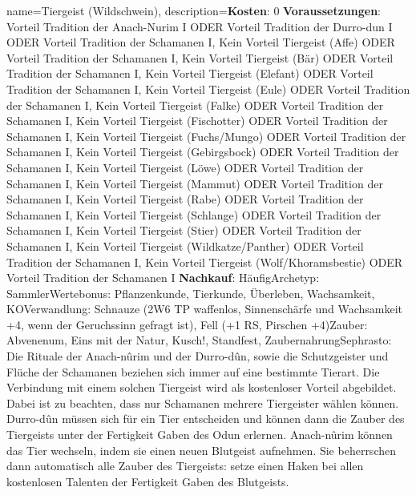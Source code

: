 {
    name={Tiergeist (Wildschwein)},
    description={\textbf{Kosten}: 0 \textbf{Voraussetzungen}: Vorteil Tradition der Anach-Nurim I ODER Vorteil Tradition der Durro-dun I ODER Vorteil Tradition der Schamanen I, Kein Vorteil Tiergeist (Affe) ODER Vorteil Tradition der Schamanen I, Kein Vorteil Tiergeist (Bär) ODER Vorteil Tradition der Schamanen I, Kein Vorteil Tiergeist (Elefant) ODER Vorteil Tradition der Schamanen I, Kein Vorteil Tiergeist (Eule) ODER Vorteil Tradition der Schamanen I, Kein Vorteil Tiergeist (Falke) ODER Vorteil Tradition der Schamanen I, Kein Vorteil Tiergeist (Fischotter) ODER Vorteil Tradition der Schamanen I, Kein Vorteil Tiergeist (Fuchs/Mungo) ODER Vorteil Tradition der Schamanen I, Kein Vorteil Tiergeist (Gebirgsbock) ODER Vorteil Tradition der Schamanen I, Kein Vorteil Tiergeist (Löwe) ODER Vorteil Tradition der Schamanen I, Kein Vorteil Tiergeist (Mammut) ODER Vorteil Tradition der Schamanen I, Kein Vorteil Tiergeist (Rabe) ODER Vorteil Tradition der Schamanen I, Kein Vorteil Tiergeist (Schlange) ODER Vorteil Tradition der Schamanen I, Kein Vorteil Tiergeist (Stier) ODER Vorteil Tradition der Schamanen I, Kein Vorteil Tiergeist (Wildkatze/Panther) ODER Vorteil Tradition der Schamanen I, Kein Vorteil Tiergeist (Wolf/Khoramsbestie) ODER Vorteil Tradition der Schamanen I \textbf{Nachkauf}: Häufig\newline Archetyp: Sammler\newline Wertebonus: Pflanzenkunde, Tierkunde, Überleben, Wachsamkeit, KO\newline Verwandlung: Schnauze (2W6 TP waffenlos, Sinnenschärfe und Wachsamkeit +4, wenn der Geruchssinn gefragt ist), Fell (+1 RS, Pirschen +4)\newline Zauber: Abvenenum, Eins mit der Natur, Kusch!, Standfest, Zaubernahrung\newline Sephrasto: Die Rituale der Anach-nûrim und der Durro-dûn, sowie die Schutzgeister und Flüche der Schamanen beziehen sich immer auf eine bestimmte Tierart. Die Verbindung mit einem solchen Tiergeist wird als kostenloser Vorteil abgebildet. Dabei ist zu beachten, dass nur Schamanen mehrere Tiergeister wählen können. Durro-dûn müssen sich für ein Tier entscheiden und können dann die Zauber des Tiergeists unter der Fertigkeit Gaben des Odun erlernen. Anach-nûrim können das Tier wechseln, indem sie einen neuen Blutgeist aufnehmen. Sie beherrschen dann automatisch alle Zauber des Tiergeists: setze einen Haken bei allen kostenlosen Talenten der Fertigkeit Gaben des Blutgeists.}
}


